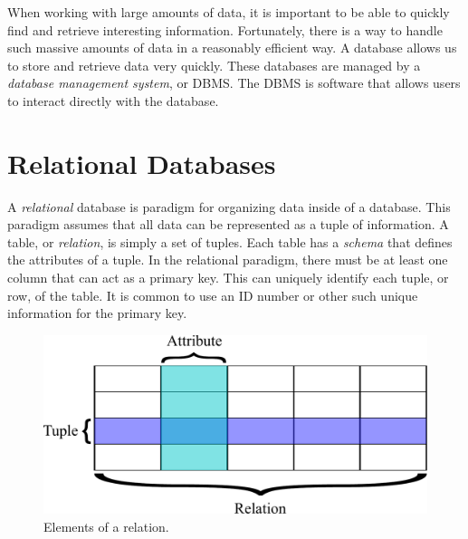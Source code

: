 \label{lab:sql_rdb}

When working with large amounts of data, it is important to be able to quickly find and retrieve interesting information.
Fortunately, there is a way to handle such massive amounts of data in a reasonably efficient way.
A database allows us to store and retrieve data very quickly.
These databases are managed by a \emph{database management system}, or DBMS.
The DBMS is software that allows users to interact directly with the database.

\section*{Relational Databases}
A \emph{relational} database is paradigm for organizing data inside of a database.
This paradigm assumes that all data can be represented as a tuple of information.
A table, or \emph{relation}, is simply a set of tuples.
Each table has a \emph{schema} that defines the attributes of a tuple.
In the relational paradigm, there must be at least one column that can act as a primary key.
This can uniquely identify each tuple, or row, of the table.
It is common to use an ID number or other such unique information for the primary key.

\begin{figure}
\centering
\includegraphics[width=\textwidth]{rdb_table.pdf}
\caption{Elements of a relation.}
\label{fig:relation}
\end{figure}

